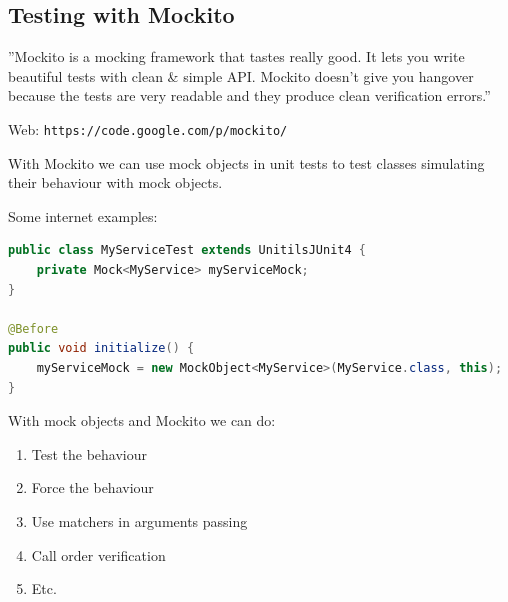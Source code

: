 \documentclass[11pt, xcolor=svgnames]{beamer}
\begin{document}

\subsection{Testing with Mockito}



\begin{frame}

''Mockito is a mocking framework that tastes really good. It lets you write beautiful tests with clean \& simple API. Mockito doesn't give you hangover because the tests are very readable and they produce clean verification errors.''

Web: \texttt{https://code.google.com/p/mockito/}
\end{frame}


\begin{frame}[fragile]
With Mockito we can use mock objects in unit tests to test classes simulating their behaviour with mock objects.

Some internet examples:

\begin{lstlisting}[language=Java,basicstyle=\tiny]
public class MyServiceTest extends UnitilsJUnit4 {
    private Mock<MyService> myServiceMock;
}

@Before
public void initialize() {
    myServiceMock = new MockObject<MyService>(MyService.class, this);
}
\end{lstlisting}
\end{frame}


\begin{frame}
With mock objects and Mockito we can do:

  \begin{enumerate}
  \item Test the behaviour
  \item Force the behaviour
  \item Use matchers in arguments passing
  \item Call order verification
  \item Etc.
  \end{enumerate}
\end{frame}
\end{document}
